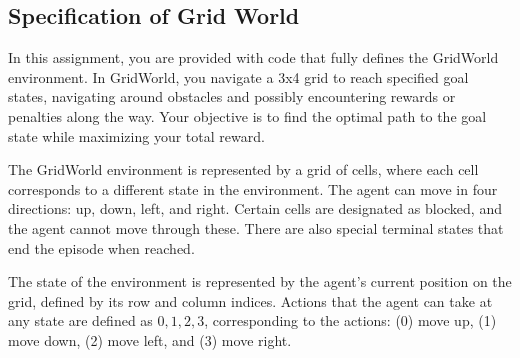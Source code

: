 \documentclass[11pt,addpoints,answers]{exam}
\begin{document}
\subsection{Specification of Grid World}
In this assignment, you are provided with code that fully defines the GridWorld environment. In GridWorld, you navigate a 3x4 grid to reach specified goal states, navigating around obstacles and possibly encountering rewards or penalties along the way. Your objective is to find the optimal path to the goal state while maximizing your total reward.

The GridWorld environment is represented by a grid of cells, where each cell corresponds to a different state in the environment. The agent can move in four directions: up, down, left, and right. Certain cells are designated as blocked, and the agent cannot move through these. There are also special terminal states that end the episode when reached.

The state of the environment is represented by the agent's current position on the grid, defined by its row and column indices. Actions that the agent can take at any state are defined as ${0, 1, 2, 3}$, corresponding to the actions: (0) move up, (1) move down, (2) move left, and (3) move right.

\begin{center}
\end{center}
\end{document}
